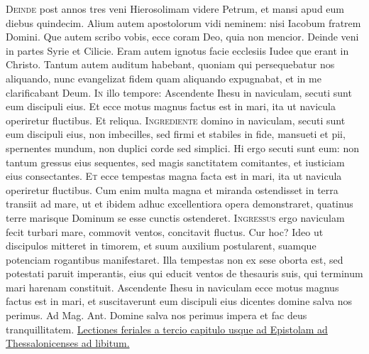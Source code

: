 \begin{multicols*}{2}
\lettrine[lines=2]{\zallmancaps \color{Red} D}{einde} post annos tres veni Hierosolimam videre Petrum, et mansi apud eum diebus quindecim. Alium autem apostolorum vidi neminem: nisi Iacobum fratrem Domini. Que autem scribo vobis, ecce coram Deo, quia non mencior. Deinde veni in partes Syrie et Cilicie. Eram autem ignotus facie ecclesiis Iudee que erant in Christo. Tantum autem auditum habebant, quoniam qui persequebatur nos aliquando, nunc evangelizat fidem quam aliquando expugnabat, et in me clarificabant Deum.
\lettrine[lines=2]{\zallmancaps \color{Blue} I}{n} illo tempore: Ascendente Ihesu in naviculam, secuti sunt eum discipuli eius. Et ecce motus magnus factus est in mari, ita ut navicula operiretur fluctibus. Et reliqua.
\lettrine[lines=2]{\zallmancaps \color{Red} I}{ngrediente} domino in naviculam, secuti sunt eum discipuli eius, non imbecilles, sed firmi et stabiles in fide, mansueti et pii, spernentes mundum, non duplici corde sed simplici. Hi ergo secuti sunt eum: non tantum gressus eius sequentes, sed magis sanctitatem comitantes, et iusticiam eius consectantes.
\lettrine[lines=2]{\zallmancaps \color{Blue} E}{t} ecce tempestas magna facta est in mari, ita ut navicula operiretur fluctibus. Cum enim multa magna et miranda ostendisset in terra transiit ad mare, ut et ibidem adhuc excellentiora opera demonstraret, quatinus terre marisque Dominum se esse cunctis ostenderet.
\lettrine[lines=2]{\zallmancaps \color{Red} I}{ngressus} ergo naviculam fecit turbari mare, commovit ventos, concitavit fluctus. Cur hoc? Ideo ut discipulos mitteret in timorem, et suum auxilium postularent, suamque potenciam rogantibus manifestaret. Illa tempestas non ex sese oborta est, sed potestati paruit imperantis, eius qui educit ventos de thesauris suis, qui terminum mari harenam constituit.
 Ascendente Ihesu in naviculam ecce motus magnus factus est in mari, et suscitaverunt eum discipuli eius dicentes domine salva nos perimus. {\color{Red} Ad Mag. Ant.} Domine salva nos perimus impera et fac deus tranquillitatem.
\newline \ul{Lectiones feriales a tercio capitulo usque ad Epistolam ad Thessalonicenses ad libitum.}

\end{multicols*}
